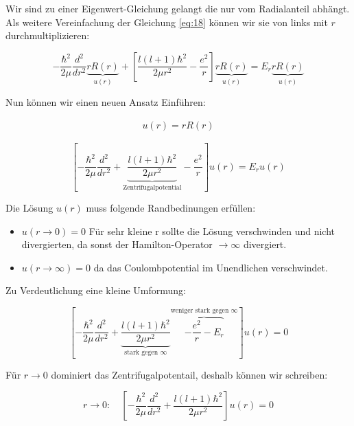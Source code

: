 Wir sind zu einer Eigenwert-Gleichung gelangt die nur vom Radialanteil abhängt. Als weitere Vereinfachung der Gleichung \eqref{eq:18} können wir sie von links mit \(r\) durchmultiplizieren:

\begin{equation}
  \label{eq:19}
   - \frac{\hbar^2}{2\mu}\frac{d^2}{dr^2}\underbrace{r R(r)}_{u(r)} + \left[\frac{l(l+1)\hbar^2}{2\mu r^2}  - \frac{e^2}{r}\right] \underbrace{r R(r)}_{u(r)}   = E_r \underbrace{r R(r)}_{u(r)}
\end{equation}

Nun können wir einen neuen Ansatz Einführen:

\begin{align}
  \label{eq:30}
  u(r) = rR(r)
\end{align}


\begin{equation}
  \label{eq:20}
    \left[-\frac{\hbar^2}{2\mu}\frac{d^2}{dr^2} + \underbrace{\frac{l(l+1)\hbar^2}{2\mu r^2}}_{\text{Zentrifugalpotential}}  - \frac{e^2}{r}\right] u(r)   = E_r u(r)
\end{equation}

Die Lösung \(u(r)\) muss folgende Randbedinungen erfüllen:

\begin{itemize}
\item \(u(r \to 0)=0  \) Für sehr kleine r sollte die Lösung verschwinden und nicht divergierten, da sonst der Hamilton-Operator \(\to\infty\) divergiert.
\item  \(u(r \to \infty)=0  \) da das Coulombpotential im Unendlichen verschwindet.
\end{itemize}

Zu Verdeutlichung eine kleine Umformung:

\begin{equation}
  \label{eq:22}
   \left[-\frac{\hbar^2}{2\mu}\frac{d^2}{dr^2} + \underbrace{\frac{l(l+1)\hbar^2}{2\mu r^2}}_{\text{stark gegen }\infty}  \overbrace{- \frac{e^2}{r} - E_r}^{\text{weniger stark gegen }\infty}   \right] u(r)   = 0 
\end{equation}

Für \(r\to 0\) dominiert das Zentrifugalpotentail, deshalb können wir schreiben:

\begin{equation}
  \label{eq:21}
  r\to 0: \quad\left[-\frac{\hbar^2}{2\mu}\frac{d^2}{dr^2}+ \frac{l(l+1)\hbar^2}{2\mu r^2}\right] u(r) = 0
\end{equation}

